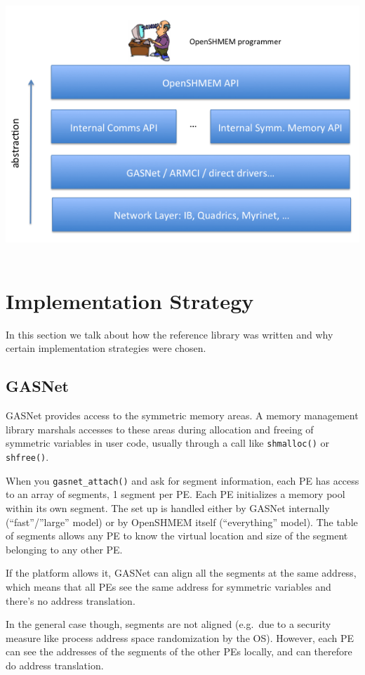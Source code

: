 \documentclass[english]{article}
\begin{document}
\medskip{}

\title{\includegraphics[scale=0.5]{implementation}}

\section{Implementation Strategy}

In this section we talk about how the reference library was written
and why certain implementation strategies were chosen.

\subsection{GASNet}

GASNet provides access to the symmetric memory areas. A memory
management library marshals accesses to these areas during allocation
and freeing of symmetric variables in user code, usually through a
call like \texttt{shmalloc()} or \texttt{shfree()}.

When you \texttt{gasnet\_attach()} and ask for segment information,
each PE has access to an array of segments, 1 segment per PE. Each PE
initializes a memory pool within its own segment. The set up is
handled either by GASNet internally (``fast''/''large'' model) or by
OpenSHMEM itself (``everything'' model). The table of segments
allows any PE to know the virtual location and size of the segment
belonging to any other PE.

If the platform allows it, GASNet can align all the segments at the
same address, which means that all PEs see the same address for
symmetric variables and there's no address translation.

In the general case though, segments are not aligned (e.g.\ due to a
security measure like process address space randomization by the
OS). However, each PE can see the addresses of the segments of the
other PEs locally, and can therefore do address translation.
\end{document}
